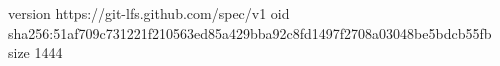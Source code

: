 version https://git-lfs.github.com/spec/v1
oid sha256:51af709c731221f210563ed85a429bba92c8fd1497f2708a03048be5bdcb55fb
size 1444

